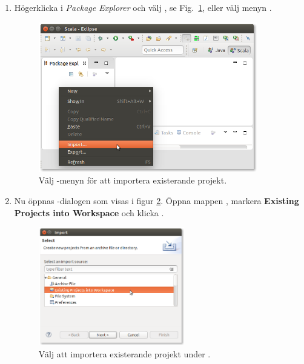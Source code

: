 \begin{enumerate}
\item Högerklicka i \textit{Package Explorer} och välj , se Fig.~\ref{fig:eclipse:import}, eller välj menyn .

\begin{figure}[h]
\centering
\includegraphics[width=0.9\textwidth]{../img/eclipse/eclipse-import.png}
\caption {Välj -menyn för att importera existerande projekt.}
\label{fig:eclipse:import}
\end{figure}

\item Nu öppnas -dialogen som visas i figur \ref{fig:eclipse:import-existing}. Öppna mappen , markera \textbf{Existing Projects into Workspace} och klicka .



\begin{figure}[h]
\centering
\includegraphics[width=0.6\textwidth]{../img/eclipse/eclipse-import-existing.png}
\caption {Välj att importera existerande projekt under .}
\label{fig:eclipse:import-existing}
\end{figure}



\end{enumerate}
